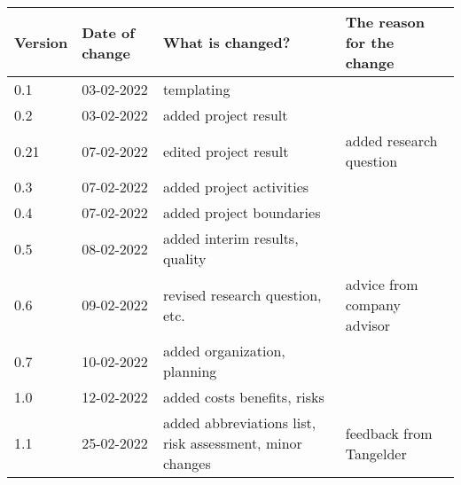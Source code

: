\begin{tabular}{ | l | l | l | l |}
    \hline
    \textbf{Version} & \textbf{Date of change} & \textbf{What is changed?} & \textbf{The reason for the change} \\ \hline
    0.1 & 03-02-2022 & templating & \\
    0.2 & 03-02-2022 & added project result & \\
    0.21 & 07-02-2022 & edited project result & added research question\\
    0.3 & 07-02-2022 & added project activities &\\
    0.4 & 07-02-2022 & added project boundaries &\\
    0.5 & 08-02-2022 & added interim results, quality &\\
    0.6 & 09-02-2022 & revised research question, etc. & advice from company advisor\\
    0.7 & 10-02-2022 & added organization, planning &\\
    1.0 & 12-02-2022 & added costs benefits, risks&\\
    1.1 & 25-02-2022 & added abbreviations list, risk assessment, minor changes& feedback from Tangelder\\
    \hline
\end{tabular}